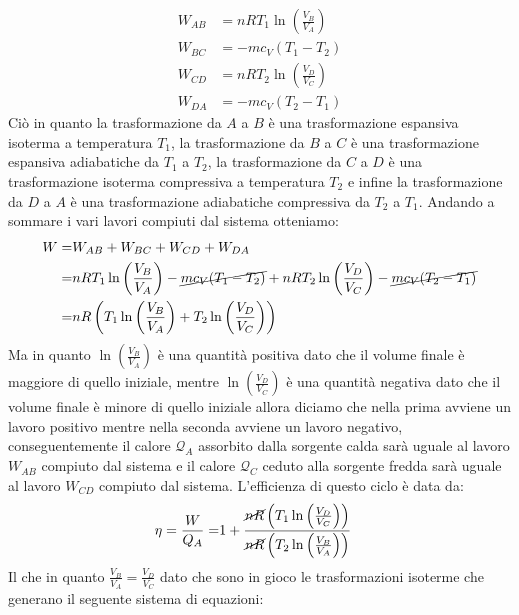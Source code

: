         \begin{align*}
            W_{AB} &= nRT_{1}\operatorname{ln}\left(\frac{V_B}{V_A}\right)\\
            W_{BC} &= -mc_V(T_1-T_2)\\
            W_{CD} &= nRT_{2}\operatorname{ln}\left(\frac{V_D}{V_C}\right)\\
            W_{DA} &= -mc_V(T_2-T_1)
        \end{align*}
        Ciò in quanto la trasformazione da $A$ a $B$ è una trasformazione espansiva isoterma a temperatura $T_1$, la trasformazione da $B$ a $C$ è una trasformazione espansiva adiabatiche da $T_1$ a $T_2$, la trasformazione da $C$ a $D$ è una trasformazione isoterma compressiva a temperatura $T_2$ e infine la trasformazione da $D$ a $A$ è una trasformazione adiabatiche compressiva da $T_2$ a $T_1$. Andando a sommare i vari lavori compiuti dal sistema otteniamo:
        \begin{align*}
            W =& W_{AB} + W_{BC} + W_{CD} + W_{DA}\\
            =& nRT_{1}\operatorname{ln}\left(\frac{V_B}{V_A}\right) - \cancel{mc_V(T_1-T_2)} + nRT_{2}\operatorname{ln}\left(\frac{V_D}{V_C}\right) - \cancel{mc_V(T_2-T_1)}\\
            =& nR\left(T_{1}\operatorname{ln}\left(\frac{V_B}{V_A}\right) + T_{2}\operatorname{ln}\left(\frac{V_D}{V_C}\right)\right)
        \end{align*}
        Ma in quanto $\operatorname{ln}\left(\frac{V_B}{V_A}\right)$ è una quantità positiva dato che il volume finale è maggiore di quello iniziale, mentre $\operatorname{ln}\left(\frac{V_D}{V_C}\right)$ è una quantità negativa dato che il volume finale è minore di quello iniziale allora diciamo che nella prima avviene un lavoro positivo mentre nella seconda avviene un lavoro negativo, conseguentemente il calore $\mathcal{Q}_A$ assorbito dalla sorgente calda sarà uguale al lavoro $W_{AB}$ compiuto dal sistema e il calore $\mathcal{Q}_C$ ceduto alla sorgente fredda sarà uguale al lavoro $W_{CD}$ compiuto dal sistema. L'efficienza di questo ciclo è data da:
        \begin{align*}
            \eta = \frac{W}{Q_A} =& 1 + \frac{\cancel{nR}\left(T_{1}\operatorname{ln}\left(\frac{V_D}{V_C}\right)\right)}{\cancel{nR}\left(T_{2}\operatorname{ln}\left(\frac{V_B}{V_A}\right)\right)}
        \end{align*}
        Il che in quanto $\frac{V_B}{V_A}=\frac{V_D}{V_C}$ dato che sono in gioco le trasformazioni isoterme che generano il seguente sistema di equazioni:
